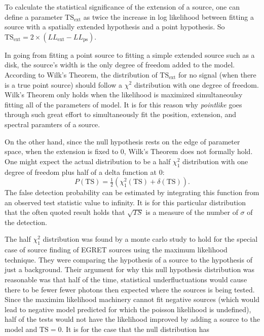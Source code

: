 \documentclass[12pt]{article}
\begin{document}
To calculate the statistical significance of the extension of a source,
one can define a parameter $\text{TS}_\text{ext}$ as twice the increase
in log likelihood between fitting a source with a
spatially extended hypothesis and a point hypothesis. 
So $\text{TS}_\text{ext}=2\times(LL_\text{ext}-LL_\text{ps})$.

In going from fitting a point source to fitting a simple extended source such as
a disk, the source's width is the only degree of freedom added to the model. According to
Wilk's Theorem, the distribution of $\text{TS}_\text{ext}$ for no signal (when there is a true
point source) should follow a $\chi^2$ distribution with one degree of freedom\cite{Wilks_Theorem}.
Wilk's Theorem only holds when the likelihood is maximized simultaneoulsy
fitting all of the parameters of model. It is for this reason why {\em pointlike}
goes through such great effort to simultaneously fit the position, extension,
and spectral paramters of a source.

On the other hand, since the null hypothesis rests on the edge of
parameter space, when the extension is fixed to 0, Wilk's Theorem does
not formally hold\cite{Warnings about Wilk's Theorem Paper}.  One might
expect the actual distribution to be a half $\chi^2_1$ distribution with
one degree of freedom plus half of a delta function at 0:
\begin{equation}
  P(\text{TS})=\tfrac{1}{2}(\chi^2_1(\text{TS})+\delta(\text{TS})).
\end{equation}
The false detection probability can be estimated by integrating this function 
from an observed test statistic value to infinity. It is for this
particular distribution that the often quoted result holds that
$\sqrt{TS}$ is a measure of the number of $\sigma$ of the detection.

The half $\chi^2_1$ distribution was found by a monte carlo study
to hold for the special case of source finding of EGRET sources using the
maximum likelihood technique.  They were comparing the hypothesis of a
source to the hypothesis of just a background\cite{Mattox_et_All_Paper}.
Their argument for why this null hypothesis distribution was reasonable
was that half of the time, statistical underfluctuations would cause
there to be fewer fewer photons then expected where the sources is being
tested. Since the maximim likelihood machinery cannot fit negative
sources (which would lead to negative model predicted for which the
poisson likelihood is undefined), half of the tests would not have the
likelihood improved by adding a source to the model and $\text{TS}=0$.
It is for the case that the null distribution has 
\end{document}
